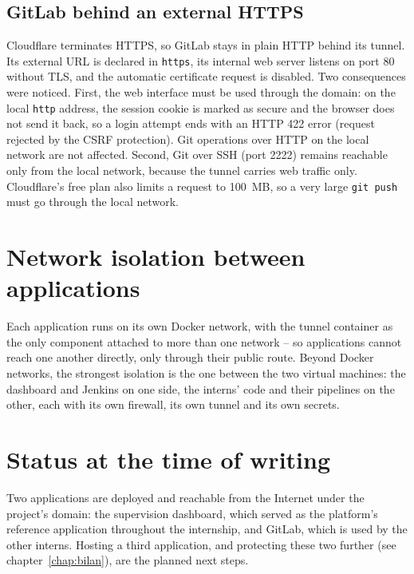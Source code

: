 \subsection{GitLab behind an external HTTPS}
Cloudflare terminates HTTPS, so GitLab stays in plain HTTP behind its tunnel. Its external URL is declared in \texttt{https}, its internal web server listens on port 80 without TLS, and the automatic certificate request is disabled. Two consequences were noticed. First, the web interface must be used through the domain: on the local \texttt{http} address, the session cookie is marked as secure and the browser does not send it back, so a login attempt ends with an HTTP 422 error (request rejected by the CSRF protection). Git operations over HTTP on the local network are not affected. Second, Git over SSH (port 2222) remains reachable only from the local network, because the tunnel carries web traffic only. Cloudflare's free plan also limits a request to 100~MB, so a very large \texttt{git push} must go through the local network.

\section{Network isolation between applications}
Each application runs on its own Docker network, with the tunnel container as the only component attached to more than one network -- so applications cannot reach one another directly, only through their public route. Beyond Docker networks, the strongest isolation is the one between the two virtual machines: the dashboard and Jenkins on one side, the interns' code and their pipelines on the other, each with its own firewall, its own tunnel and its own secrets.

\section{Status at the time of writing}
Two applications are deployed and reachable from the Internet under the project's domain: the supervision dashboard, which served as the platform's reference application throughout the internship, and GitLab, which is used by the other interns. Hosting a third application, and protecting these two further (see chapter~\ref{chap:bilan}), are the planned next steps.

\clearpage

